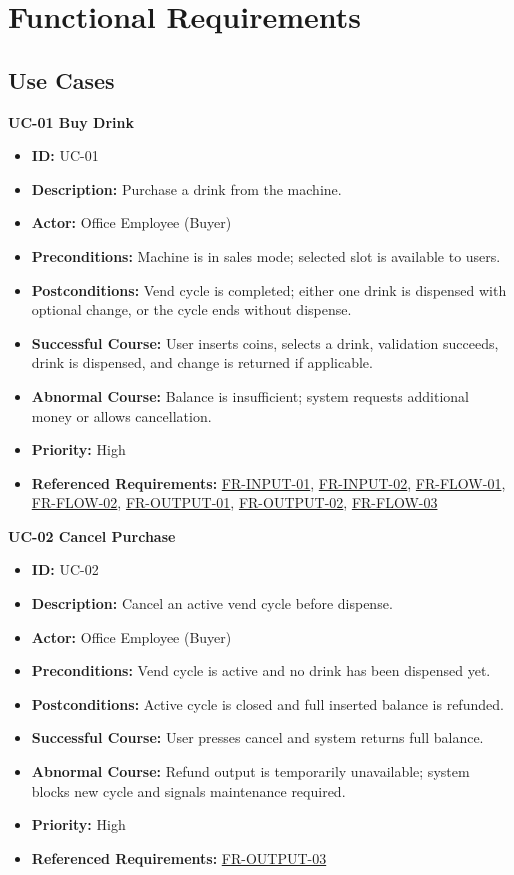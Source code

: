 \documentclass[a4paper,12pt]{article}
\newcommand{\reqref}[1]{\hyperlink{req:#1}{#1}}
\begin{document}
    \section{Functional Requirements}

    \subsection{Use Cases}
    \textbf{UC-01 Buy Drink}
    \begin{itemize}[itemsep=0pt,topsep=0pt,parsep=0pt,partopsep=0pt]
        \item \textbf{ID:} UC-01
        \item \textbf{Description:} Purchase a drink from the machine.
        \item \textbf{Actor:} Office Employee (Buyer)
        \item \textbf{Preconditions:} Machine is in sales mode; selected slot is available to users.
        \item \textbf{Postconditions:} Vend cycle is completed; either one drink is dispensed with optional change, or the cycle ends without dispense.
        \item \textbf{Successful Course:} User inserts coins, selects a drink, validation succeeds, drink is dispensed, and change is returned if applicable.
        \item \textbf{Abnormal Course:} Balance is insufficient; system requests additional money or allows cancellation.
        \item \textbf{Priority:} High
        \item \textbf{Referenced Requirements:} \reqref{FR-INPUT-01}, \reqref{FR-INPUT-02}, \reqref{FR-FLOW-01}, \reqref{FR-FLOW-02}, \reqref{FR-OUTPUT-01}, \reqref{FR-OUTPUT-02}, \reqref{FR-FLOW-03}
    \end{itemize}

    \textbf{UC-02 Cancel Purchase}
    \begin{itemize}[itemsep=0pt,topsep=0pt,parsep=0pt,partopsep=0pt]
        \item \textbf{ID:} UC-02
        \item \textbf{Description:} Cancel an active vend cycle before dispense.
        \item \textbf{Actor:} Office Employee (Buyer)
        \item \textbf{Preconditions:} Vend cycle is active and no drink has been dispensed yet.
        \item \textbf{Postconditions:} Active cycle is closed and full inserted balance is refunded.
        \item \textbf{Successful Course:} User presses cancel and system returns full balance.
        \item \textbf{Abnormal Course:} Refund output is temporarily unavailable; system blocks new cycle and signals maintenance required.
        \item \textbf{Priority:} High
        \item \textbf{Referenced Requirements:} \reqref{FR-OUTPUT-03}
    \end{itemize}
\end{document}
